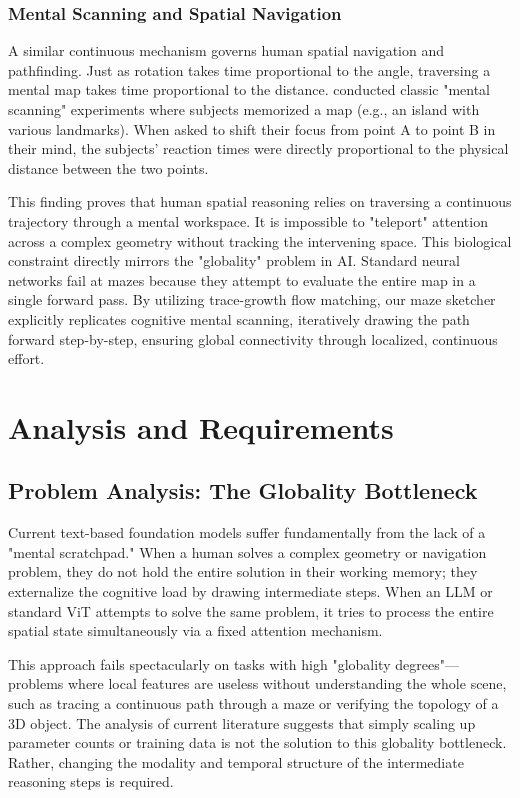 \documentclass{l4proj}
\begin{document}
\subsection{Mental Scanning and Spatial Navigation}
A similar continuous mechanism governs human spatial navigation and pathfinding. Just as rotation takes time proportional to the angle, traversing a mental map takes time proportional to the distance. \cite{kosslyn1978visual} conducted classic "mental scanning" experiments where subjects memorized a map (e.g., an island with various landmarks). When asked to shift their focus from point A to point B in their mind, the subjects' reaction times were directly proportional to the physical distance between the two points.

This finding proves that human spatial reasoning relies on traversing a continuous trajectory through a mental workspace. It is impossible to "teleport" attention across a complex geometry without tracking the intervening space. This biological constraint directly mirrors the "globality" problem in AI. Standard neural networks fail at mazes because they attempt to evaluate the entire map in a single forward pass. By utilizing trace-growth flow matching, our maze sketcher explicitly replicates cognitive mental scanning, iteratively drawing the path forward step-by-step, ensuring global connectivity through localized, continuous effort.




\chapter{Analysis and Requirements}

\section{Problem Analysis: The Globality Bottleneck}
Current text-based foundation models suffer fundamentally from the lack of a "mental scratchpad." When a human solves a complex geometry or navigation problem, they do not hold the entire solution in their working memory; they externalize the cognitive load by drawing intermediate steps. When an LLM or standard ViT attempts to solve the same problem, it tries to process the entire spatial state simultaneously via a fixed attention mechanism.

This approach fails spectacularly on tasks with high "globality degrees"—problems where local features are useless without understanding the whole scene, such as tracing a continuous path through a maze or verifying the topology of a 3D object. The analysis of current literature suggests that simply scaling up parameter counts or training data is not the solution to this globality bottleneck. Rather, changing the modality and temporal structure of the intermediate reasoning steps is required.
\end{document}
